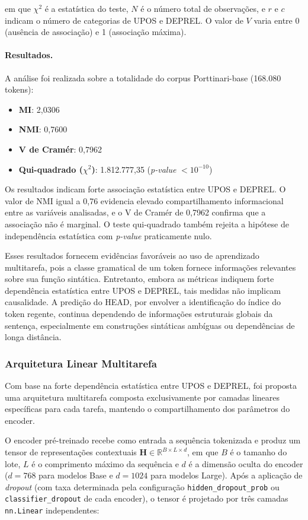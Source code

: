 em que $\chi^2$ é a estatística do teste, $N$ é o número total de observações, e $r$ e $c$
indicam o número de categorias de UPOS e DEPREL. O valor de $V$ varia entre 0 (ausência de
associação) e 1 (associação máxima).

\paragraph{Resultados.}
A análise foi realizada sobre a totalidade do corpus Porttinari-base (168.080 tokens):

\begin{itemize}
    \item \textbf{MI}: 2,0306
    \item \textbf{NMI}: 0,7600
    \item \textbf{V de Cramér}: 0,7962
    \item \textbf{Qui-quadrado ($\chi^2$)}: 1.812.777,35 (\textit{p-value} $< 10^{-10}$)
\end{itemize}

Os resultados indicam forte associação estatística entre UPOS e DEPREL. O valor de NMI igual
a 0,76 evidencia elevado compartilhamento informacional entre as variáveis analisadas, e o
V de Cramér de 0,7962 confirma que a associação não é marginal. O teste qui-quadrado também
rejeita a hipótese de independência estatística com \textit{p-value} praticamente nulo.

Esses resultados fornecem evidências favoráveis ao uso de aprendizado multitarefa, pois a
classe gramatical de um token fornece informações relevantes sobre sua função sintática.
Entretanto, embora as métricas indiquem forte dependência estatística entre UPOS e DEPREL,
tais medidas não implicam causalidade. A predição do HEAD, por envolver a identificação do
índice do token regente, continua dependendo de informações estruturais globais da sentença,
especialmente em construções sintáticas ambíguas ou dependências de longa distância.

\subsubsection*{Arquitetura Linear Multitarefa}

Com base na forte dependência estatística entre UPOS e DEPREL, foi proposta uma arquitetura
multitarefa composta exclusivamente por camadas lineares específicas para cada tarefa,
mantendo o compartilhamento dos parâmetros do encoder.

O encoder pré-treinado recebe como entrada a sequência tokenizada e produz um tensor de
representações contextuais $\mathbf{H} \in \mathbb{R}^{B \times L \times d}$, em que $B$ é
o tamanho do lote, $L$ é o comprimento máximo da sequência e $d$ é a dimensão oculta do
encoder ($d = 768$ para modelos Base e $d = 1024$ para modelos Large). Após a aplicação de
\textit{dropout} (com taxa determinada pela configuração \texttt{hidden\_dropout\_prob} ou
\texttt{classifier\_dropout} de cada encoder), o tensor é projetado por três camadas
\texttt{nn.Linear} independentes:

